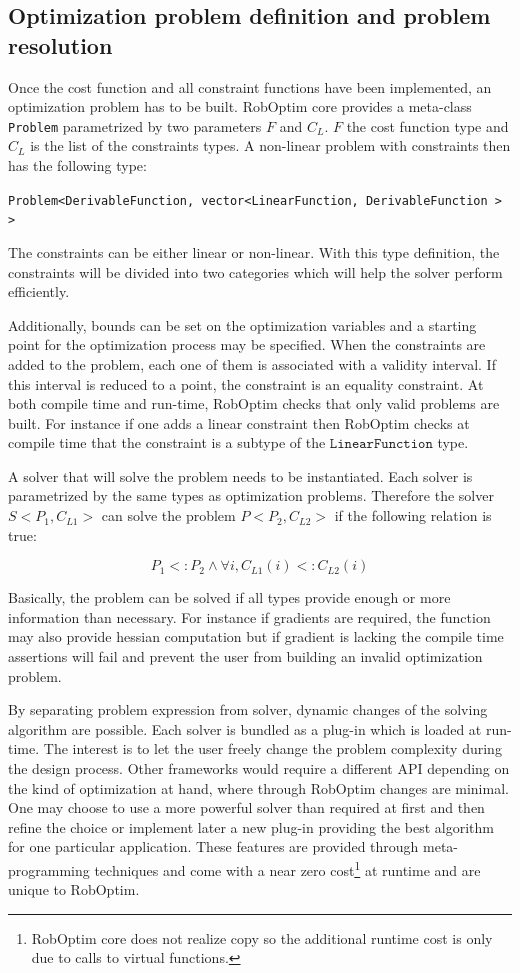 \documentclass[conference,final,a4paper,twocolumn,9pt]{IEEEtran}
\begin{document}
\subsection{Optimization problem definition and problem resolution}


Once the cost function and all constraint functions have been
implemented, an optimization problem has to be built. RobOptim core
provides a meta-class \texttt{Problem} parametrized by two parameters
$F$ and $C_L$. $F$ the cost function type and $C_L$ is the list of the
constraints types. A non-linear problem with constraints then has the
following type:


\texttt{Problem<DerivableFunction, vector<LinearFunction, DerivableFunction > >}


The constraints can be either linear or non-linear. With this type
definition, the constraints will be divided into two categories which
will help the solver perform efficiently.

Additionally, bounds can be set on the optimization variables and a
starting point for the optimization process may be specified. When the
constraints are added to the problem, each one of them is associated
with a validity interval. If this interval is reduced to a point, the
constraint is an equality constraint. At both compile time and
run-time, RobOptim checks that only valid problems are built. For
instance if one adds a linear constraint then RobOptim checks at
compile time that the constraint is a subtype of the
$\texttt{LinearFunction}$ type.


A solver that will solve the problem needs to be instantiated. Each
solver is parametrized by the same types as optimization
problems. Therefore the solver $S<P_1,C_{L1}>$ can solve the problem
$P<P_2,C_{L2}>$ if the following relation is true:


\begin{equation}
  P_1 <: P_2 \wedge \forall i, C_{L1}(i) <: C_{L2}(i)
\end{equation}


Basically, the problem can be solved if all types provide enough or
more information than necessary. For instance if gradients are
required, the function may also provide hessian computation but if
gradient is lacking the compile time assertions will fail and prevent
the user from building an invalid optimization problem.

By separating problem expression from solver, dynamic changes of the
solving algorithm are possible. Each solver is bundled as a plug-in
which is loaded at run-time. The interest is to let the user freely
change the problem complexity during the design process. Other
frameworks would require a different API depending on the kind of
optimization at hand, where through RobOptim changes are minimal. One
may choose to use a more powerful solver than required at first and
then refine the choice or implement later a new plug-in providing the
best algorithm for one particular application. These features are
provided through meta-programming techniques and come with a near zero
cost\footnote{RobOptim core does not realize copy so the additional
  runtime cost is only due to calls to virtual functions.} at runtime
and are unique to RobOptim.
\end{document}

